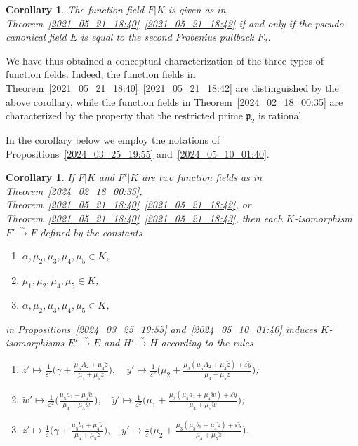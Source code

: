 \documentclass[12pt,reqno]{amsart}
\newtheorem{cor}[thm]{Corollary}
\theoremstyle{definition}
\newcommand{\pp}{\mathfrak{p}}
\newcommand{\al}{\alpha}
\newcommand{\ga}{\gamma}
\newcommand{\eps}{\varepsilon}
\begin{document}
\begin{cor}\label{2022_03_11_14:35}
The function field $F|K$ is given as in Theorem~\ref{2021_05_21_18:40}~\ref{2021_05_21_18:42}  
if and only if the pseudo-canonical field $E$ is equal to the second Frobenius pullback $F_2$. 
\end{cor}

We have thus obtained a conceptual characterization of the three types of function fields.
Indeed, the function fields in Theorem~\ref{2021_05_21_18:40}~\ref{2021_05_21_18:42} are distinguished by the above corollary, while the function fields in Theorem~\ref{2024_02_18_00:35} are characterized by the property that the restricted prime $\pp_2$ is rational.

In the corollary below we employ the notations of Propositions~\ref{2024_03_25_19:55} and~\ref{2024_05_10_01:40}.

\begin{cor}\label{2024_08_04_20:25}
If $F|K$ and $F'|K$ are two function fields as in Theorem~\ref{2024_02_18_00:35}, Theorem~\ref{2021_05_21_18:40}~\ref{2021_05_21_18:42}, or Theorem~\ref{2021_05_21_18:40}~\ref{2021_05_21_18:43},
then each $K$-isomorphism $F' \overset\sim\to F$ defined by the constants 
\begin{enumerate}[\upshape (a)]
    \item $\al,\mu_2,\mu_3,\mu_4,\mu_5 \in K$,
    \item $\mu_1,\mu_2,\mu_4,\mu_5 \in K$,
    \item $\al,\mu_2,\mu_3,\mu_4,\mu_5 \in K$,
\end{enumerate}
in Propositions~\ref{2024_03_25_19:55} and~\ref{2024_05_10_01:40} induces $K$-isomorphisms $E' \overset\sim\to E$ and $H' \overset\sim \to H$ according to the rules
\begin{enumerate}[\upshape (a)]
    \item $\displaystyle\breve z' \mapsto \frac 1 {\eps^3} \bigg( \ga + \frac{\mu_5 A_2 + \mu_4 \breve z}{\mu_4 + \mu_5 \breve z} \bigg), \quad 
    \breve y' \mapsto \frac 1 {\eps^2} \bigg( \mu_2 + \frac{\mu_3 (\mu_5 A_2 + \mu_4 \breve z) + \eps \breve y}{\mu_4 + \mu_5 \breve z} \bigg)$;
 
    \item $\displaystyle \breve w' \mapsto \frac 1 {\eps^2} \bigg( \frac{\mu_5 a_2 + \mu_4 \breve w}{\mu_4 + \mu_5 \breve w}\bigg), \quad
    \breve y' \mapsto \frac 1 {\eps^2} \bigg( \mu_1 + \frac{\mu_2 (\mu_5 a_2 + \mu_4 \breve w) + \eps \breve y}{\mu_4 + \mu_5 \breve w} \bigg)$;
    
    \item $\displaystyle  \breve z' \mapsto \frac 1 \eps \bigg( \ga + \frac{\mu_5 b_1 + \mu_4 \breve z}{\mu_4 + \mu_5 \breve z}\bigg), \quad
    \breve y' \mapsto \frac 1 \eps \bigg( \mu_2 + \frac{\mu_3 (\mu_5 b_1 + \mu_4 \breve z) + \eps \breve y}{\mu_4 + \mu_5 \breve z} \bigg)$.
\end{enumerate}
\end{cor}
\end{document}
